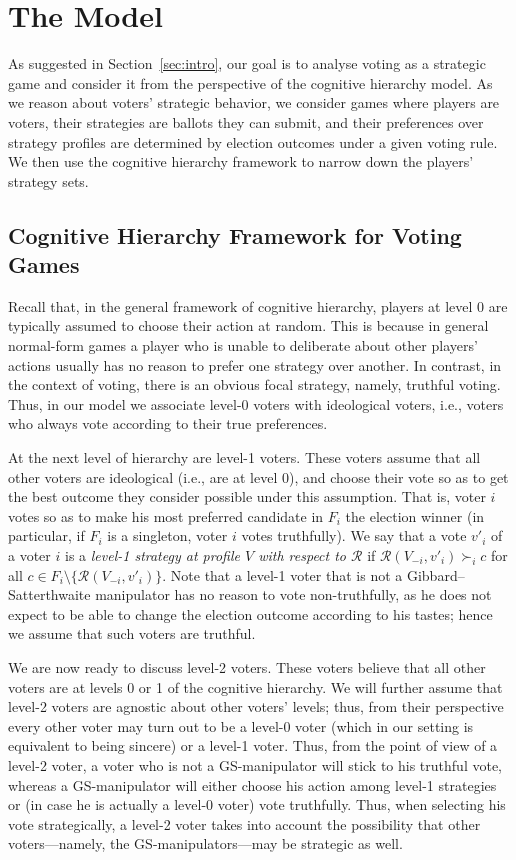 \documentclass[11pt]{article}
\newcommand{\calR}{\mathcal{R}}
\begin{document}

\section{The Model}\label{sec:model}
As suggested in Section~\ref{sec:intro}, our goal is to analyse voting as a strategic game
and consider it from the perspective of the cognitive hierarchy model. As we reason about voters'
strategic behavior, we consider games where players are voters, their strategies 
are ballots they can submit, and their preferences over strategy profiles 
are determined by election outcomes under a given voting rule. We then use the cognitive hierarchy framework
to narrow down the players' strategy sets.

\subsection{Cognitive Hierarchy Framework for Voting Games}
Recall that, in the general framework of cognitive hierarchy, players at level 0 are 
typically assumed to choose their action at random. This is because in general normal-form
games a player who is unable to deliberate about other players' actions 
usually has no reason to prefer one strategy over another.
In contrast, in the context of voting, there is an obvious focal strategy, namely, truthful
voting. Thus, in our model we associate level-0 voters with ideological voters, 
i.e., voters who always vote according to their true preferences.

At the next level of hierarchy are level-1 voters. These voters
assume that all other voters are ideological (i.e., are at level 0), 
and choose their vote so as to get the best outcome they consider possible under this assumption.
That is, voter $i$ votes so as to make his most preferred candidate in $F_i$
the election winner (in particular, if $F_i$ is a singleton, voter $i$ votes truthfully).
We say that a vote $v'_i$ of a voter $i$ 
is a {\em level-1 strategy at profile $V$ with respect to $\calR$} 
if $\calR(V_{-i}, v'_i)\succ_i c$ for all $c\in F_i\setminus\{\calR(V_{-i}, v'_i)\}$.
Note that a level-1 voter that is not a Gibbard--Satterthwaite manipulator 
has no reason to vote non-truthfully, as he does not expect
to be able to change the election outcome according to his tastes;
hence we assume that such voters are truthful.

We are now ready to discuss level-2 voters. These voters believe that all other voters
are at levels 0 or 1 of the cognitive hierarchy. We will further assume that
level-2 voters are agnostic about other voters' levels; thus, from their perspective
every other voter may turn out to be a level-0 voter (which in our setting is equivalent 
to being sincere) or a level-1 voter.
Thus, from the point of view of a level-2 voter, 
a voter who is not a GS-manipulator will stick to his truthful vote, whereas
a GS-manipulator will either choose his action among level-1 strategies or 
(in case he is actually a level-0 voter) vote truthfully.
Thus, when selecting his vote strategically, a level-2 voter takes
into account the possibility that other voters---namely, the GS-manipulators---may be strategic as well.
\end{document}
